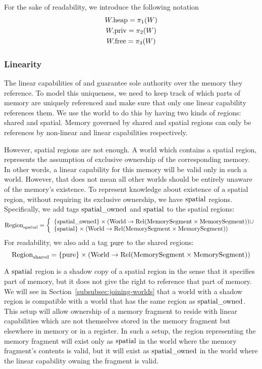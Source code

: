 \begin{jversion}
For the sake of readability, we introduce the following notation
\begin{gather*}
  W.\mathrm{heap} = \pi_1(W)\\
  W.\mathrm{priv} = \pi_2(W)\\
  W.\mathrm{free} = \pi_3(W)
\end{gather*}
\subsubsection{Linearity}
The linear capabilities of \srccm{} and \trgcm{} guarantee sole authority over the memory they reference.
To model this uniqueness, we need to keep track of which parts of memory are uniquely referenced and make sure that only one linear capability references them.
We use the world to do this by having two kinds of regions: shared and spatial.
Memory governed by shared and spatial regions can only be references by non-linear and linear capabilities respectively.

However, spatial regions are not enough.
A world which contains a spatial region, represents the assumption of exclusive ownership of the corresponding memory.
In other words, a linear capability for this memory will be valid only in such a world.
However, that does not mean all other worlds should be entirely unaware of the memory's existence.
To represent knowledge about existence of a spatial region, without requiring its exclusive ownership, we have $\mathrm{spatial}$ regions.
Specifically, we add tags $\mathrm{spatial\_owned}$ and $\mathrm{spatial}$ to the spatial regions:
\[
  \mathrm{Region}_\mathrm{spatial} = \left\{
  \begin{array}{l}
    \{\mathrm{spatial\_owned} \} \times (\mathrm{World} \rightarrow \mathrm{Rel}(\mathrm{MemorySegment} \times \mathrm{MemorySegment})) \cup \\ 
    \{\mathrm{spatial} \} \times (\mathrm{World} \rightarrow \mathrm{Rel}(\mathrm{MemorySegment} \times \mathrm{MemorySegment}))  \\
  \end{array} \right.
\]
For readability, we also add a tag $\mathrm{pure}$ to the shared regions:
\[
  \mathrm{Region}_\mathrm{shared} = \{\mathrm{pure} \} \times (\mathrm{World} \rightarrow \mathrm{Rel}(\mathrm{MemorySegment} \times \mathrm{MemorySegment})) 
\]

A $\mathrm{spatial}$ region is a shadow copy of a spatial region in the sense that it specifies part of memory, but it does not give the right to reference that part of memory.
We will see in Section~\ref{subsubsec:joining-worlds} that a world with a shadow region is compatible with a world that has the same region as $\mathrm{spatial\_owned}$.
This setup will allow ownership of a memory fragment to reside with linear capabilities which are not themselves stored in the memory fragment but elsewhere in memory or in a register.
In such a setup, the region representing the memory fragment will exist only as $\mathrm{spatial}$ in the world where the memory fragment's contents is valid, but it will exist as $\mathrm{spatial\_owned}$ in the world where the linear capability owning the fragment is valid.


\end{jversion}
